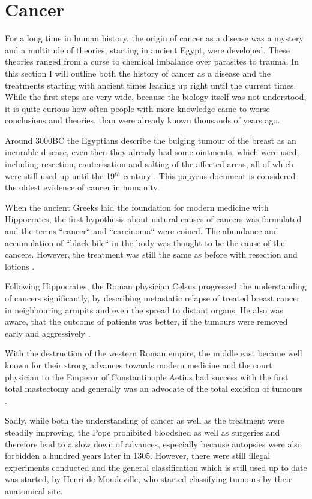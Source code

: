 \section{Cancer}
\label{intro-sec:cancer}

For a long time in human history, the origin of cancer as a disease was a mystery and a multitude of theories, starting in ancient Egypt, were developed. These theories ranged from a curse to chemical imbalance over parasites to trauma. In this section I will outline both the history of cancer as a disease and the treatments starting with ancient times leading up right until the current times. While the first steps are very wide, because the biology itself was not understood, it is quite curious how often people with more knowledge came to worse conclusions and theories, than were already known thousands of years ago.

Around 3000BC the Egyptians describe the bulging tumour of the breast as an incurable disease\cite{Breasted1930}, even then they already had some ointments, which were used, including resection, cauterisation and salting of the affected areas, all of which were still used up until the 19$^{th}$ century \cite{Hajdu2004}. This papyrus document is considered the oldest evidence of cancer in humanity.

When the ancient Greeks laid the foundation for modern medicine with Hippocrates, the first hypothesis about natural causes of cancers was formulated and the terms ``cancer`` and ``carcinoma`` were coined. The abundance and accumulation of ``black bile`` in the body was thought to be the cause of the cancers. However, the treatment was still the same as before with resection and lotions \cite{Chadwick1950}.

Following Hippocrates, the Roman physician Celsus progressed the understanding of cancers significantly, by describing metastatic relapse of treated breast cancer in neighbouring armpits and even the spread to distant organs. He also was aware, that the outcome of patients was better, if the tumours were removed early and aggressively \cite{Celsus1939}.

With the destruction of the western Roman empire, the middle east became well known for their strong advances towards modern medicine and the court physician to the Emperor of Constantinople Aetius had success with the first total mastectomy and generally was an advocate of the total excision of tumours \cite{Browne2012}. 

Sadly, while both the understanding of cancer as well as the treatment were steadily improving, the Pope prohibited bloodshed as well as surgeries and therefore lead to a slow down of advances, especially because autopsies were also forbidden a hundred years later in 1305. However, there were still illegal experiments conducted and the general classification which is still used up to date was started, by Henri de Mondeville, who started classifying tumours by their anatomical site\cite{Pilcher1895}.

